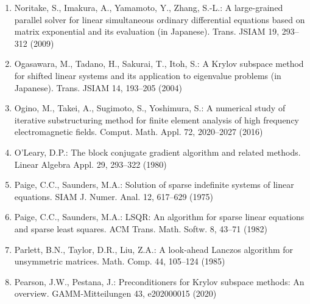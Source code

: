 \begin{enumerate}[label=\arabic*.,ref=\arabic*,leftmargin=3em]
\item\label{bib:source-139}Noritake, S., Imakura, A., Yamamoto, Y., Zhang, S.-L.: A large-grained parallel solver for linear simultaneous ordinary differential equations based on matrix exponential and its evaluation (in Japanese). Trans. JSIAM 19, 293–312 (2009)

\item\label{bib:source-140}Ogasawara, M., Tadano, H., Sakurai, T., Itoh, S.: A Krylov subspace method for shifted linear systems and its application to eigenvalue problems (in Japanese). Trans. JSIAM 14, 193–205 (2004)

\item\label{bib:source-141}Ogino, M., Takei, A., Sugimoto, S., Yoshimura, S.: A numerical study of iterative substructuring method for finite element analysis of high frequency electromagnetic fields. Comput. Math. Appl. 72, 2020–2027 (2016)

\item\label{bib:source-142}O’Leary, D.P.: The block conjugate gradient algorithm and related methods. Linear Algebra Appl. 29, 293–322 (1980)

\item\label{bib:source-143}Paige, C.C., Saunders, M.A.: Solution of sparse indefinite systems of linear equations. SIAM J. Numer. Anal. 12, 617–629 (1975)

\item\label{bib:source-144}Paige, C.C., Saunders, M.A.: LSQR: An algorithm for sparse linear equations and sparse least squares. ACM Trans. Math. Softw. 8, 43–71 (1982)

\item\label{bib:source-145}Parlett, B.N., Taylor, D.R., Liu, Z.A.: A look-ahead Lanczos algorithm for unsymmetric matrices. Math. Comp. 44, 105–124 (1985)

\item\label{bib:source-146}Pearson, J.W., Pestana, J.: Preconditioners for Krylov subspace methods: An overview. GAMM-Mitteilungen 43, e202000015 (2020)


\end{enumerate}
